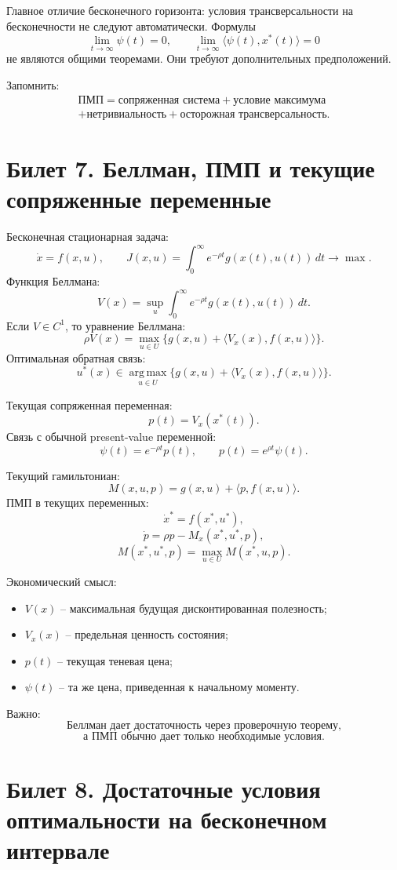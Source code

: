 \documentclass[12pt,a4paper]{article}
\begin{document}
Главное отличие бесконечного горизонта: условия трансверсальности на бесконечности не следуют автоматически. Формулы
\[
\lim_{t\to\infty}\psi(t)=0,
\qquad
\lim_{t\to\infty}\langle \psi(t),x^*(t)\rangle=0
\]
не являются общими теоремами. Они требуют дополнительных предположений.

Запомнить:
\[
\begin{gathered}
\text{ПМП}=\text{сопряженная система}+\text{условие максимума}\\
+\text{нетривиальность}+\text{осторожная трансверсальность}.
\end{gathered}
\]

\section*{Билет 7. Беллман, ПМП и текущие сопряженные переменные}

Бесконечная стационарная задача:
\[
\dot x=f(x,u),
\qquad
J(x,u)=\int_0^\infty e^{-\rho t}g(x(t),u(t))\,dt\to\max.
\]
Функция Беллмана:
\[
V(x)=\sup_u\int_0^\infty e^{-\rho t}g(x(t),u(t))\,dt.
\]
Если $V\in C^1$, то уравнение Беллмана:
\[
\rho V(x)=\max_{u\in U}\{g(x,u)+\langle V_x(x),f(x,u)\rangle\}.
\]
Оптимальная обратная связь:
\[
u^*(x)\in\operatorname*{arg\,max}_{u\in U}
\{g(x,u)+\langle V_x(x),f(x,u)\rangle\}.
\]

Текущая сопряженная переменная:
\[
p(t)=V_x(x^*(t)).
\]
Связь с обычной present-value переменной:
\[
\psi(t)=e^{-\rho t}p(t),
\qquad
p(t)=e^{\rho t}\psi(t).
\]

Текущий гамильтониан:
\[
M(x,u,p)=g(x,u)+\langle p,f(x,u)\rangle.
\]
ПМП в текущих переменных:
\[
\dot x^*=f(x^*,u^*),
\]
\[
\dot p=\rho p-M_x(x^*,u^*,p),
\]
\[
M(x^*,u^*,p)=\max_{u\in U}M(x^*,u,p).
\]

Экономический смысл:
\begin{itemize}
\item $V(x)$ -- максимальная будущая дисконтированная полезность;
\item $V_x(x)$ -- предельная ценность состояния;
\item $p(t)$ -- текущая теневая цена;
\item $\psi(t)$ -- та же цена, приведенная к начальному моменту.
\end{itemize}

Важно:
\[
\text{Беллман дает достаточность через проверочную теорему,}
\]
\[
\text{а ПМП обычно дает только необходимые условия.}
\]

\section*{Билет 8. Достаточные условия оптимальности на бесконечном интервале}
\end{document}
